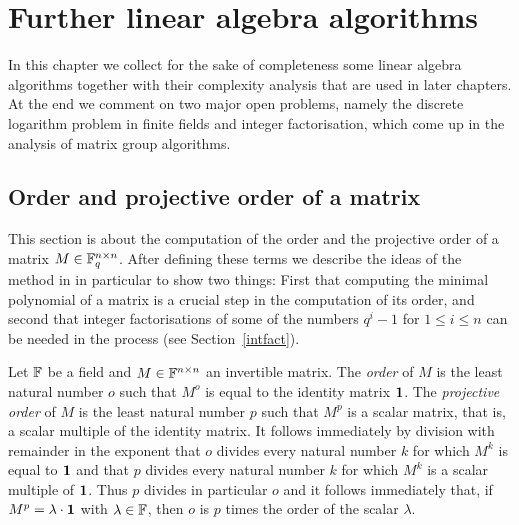 
\chapter{Further linear algebra algorithms}
\label{chap:linalg}

In this chapter we collect for the sake of completeness some
linear algebra algorithms together with their complexity analysis
that are used in later chapters. At the end we comment on two major
open problems, namely the discrete logarithm problem in finite fields and
integer factorisation, which come up in the analysis of matrix group
algorithms.

\section{Order and projective order of a matrix}
\label{sec:orders}

This section is about the computation of the order and the projective
order of a matrix $M \in \mathbb{F}_q^{n \times n}$. After defining these 
terms we describe the 
ideas of the method in \cite{CellLeedOrder} in particular to show
two things: First that computing the minimal polynomial of a matrix
%
is a crucial step in the computation of its order, and second that
integer factorisations of some of the numbers $q^i-1$ for $1 \le i \le n$ 
can be needed in the process (see Section~\ref{intfact}).

\begin{DefProp}
%
Let $\mathbb{F}$ be a field and $M \in \mathbb{F}^{n \times
n}$ an invertible matrix. The \emph{order} of $M$ is the least natural
number $o$ such that $M^o$ is equal to the identity matrix\/ $\mathbf{1}$.
The \emph{projective order} of $M$ is the least natural number $p$
such that $M^p$ is a scalar matrix, that is, a scalar multiple of the
identity matrix. It follows immediately by division with remainder in
the exponent that $o$ divides every natural number $k$ for which 
$M^k$ is equal to\/ $\mathbf{1}$ and that $p$ divides every natural number $k$
for which $M^k$ is a scalar multiple of\/ $\mathbf{1}$. Thus $p$ divides in
particular $o$ and it follows immediately that, if $M^p = \lambda \cdot
\mathbf{1}$ with $\lambda \in \mathbb{F}$, then $o$ is $p$ times the order of the
scalar $\lambda$. \proofend
\end{DefProp}

